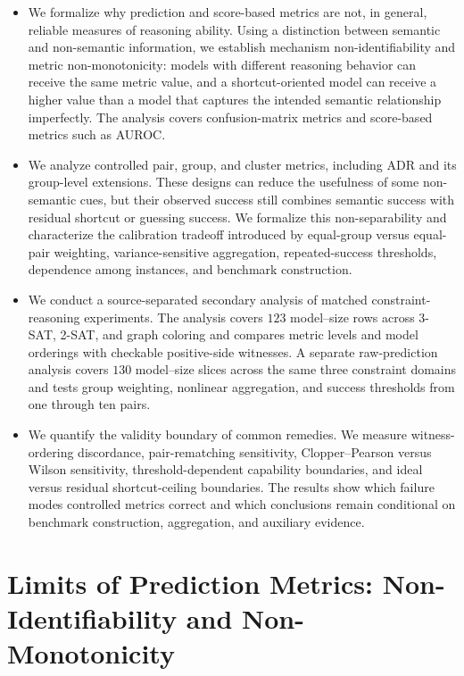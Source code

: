 \documentclass[acmsmall,screen,review,anonymous]{acmart}
\newcounter{experiment}
\begin{document}
\begin{itemize}

\item We formalize why prediction and score-based metrics are not, in
general, reliable measures of reasoning ability. Using a distinction between
semantic and non-semantic information, we establish mechanism
non-identifiability and metric non-monotonicity: models with different
reasoning behavior can receive the same metric value, and a shortcut-oriented
model can receive a higher value than a model that captures the intended
semantic relationship imperfectly. The analysis covers confusion-matrix
metrics and score-based metrics such as AUROC.

\item We analyze controlled pair, group, and cluster metrics, including ADR
and its group-level extensions. These designs can reduce the usefulness of
some non-semantic cues, but their observed success still combines semantic
success with residual shortcut or guessing success. We formalize this
non-separability and characterize the calibration tradeoff introduced by
equal-group versus equal-pair weighting, variance-sensitive aggregation,
repeated-success thresholds, dependence among instances, and benchmark
construction.

\item We conduct a source-separated secondary analysis of matched
constraint-reasoning experiments. The analysis covers \(123\) model--size
rows across 3-SAT, 2-SAT, and graph
coloring and compares metric levels and model orderings with checkable
positive-side witnesses. A separate raw-prediction analysis covers \(130\)
model--size slices across the same three constraint domains and tests group
weighting, nonlinear aggregation, and success thresholds from one through
ten pairs.

\item We quantify the validity boundary of common remedies. We measure
witness-ordering discordance, pair-rematching sensitivity, Clopper--Pearson
versus Wilson sensitivity, threshold-dependent capability boundaries, and
ideal versus residual shortcut-ceiling boundaries. The results show which
failure modes controlled metrics correct and which conclusions remain
conditional on benchmark construction, aggregation, and auxiliary evidence.

\end{itemize}

\section{Limits of Prediction Metrics: Non-Identifiability and Non-Monotonicity}
\label{sec:nonidentifiability}
\end{document}
